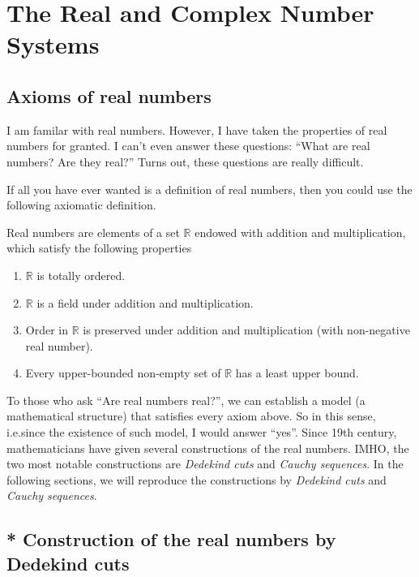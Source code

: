 \chapter{The Real and Complex Number Systems}

\section{Axioms of real numbers}

\par I am familar with real numbers. However, I have taken the properties of real numbers for granted. I can't even answer these questions: ``What are real numbers? Are they real?\@'' Turns out, these questions are really difficult.

\par If all you have ever wanted is a definition of real numbers, then you could use the following axiomatic definition.

\par Real numbers are elements of a set $\mathbb{R}$ endowed with addition and multiplication, which satisfy the following properties
\begin{enumerate}[label = (\roman*)]
    \item $\mathbb{R}$ is totally ordered.
    \item $\mathbb{R}$ is a field under addition and multiplication.
    \item Order in $\mathbb{R}$ is preserved under addition and multiplication (with non-negative real number).
    \item Every upper-bounded non-empty set of $\mathbb{R}$ has a least upper bound.
\end{enumerate}

\par To those who ask ``Are real numbers real?\@'', we can establish a model (a mathematical structure) that satisfies every axiom above. So in this sense, i.e.\@ since the existence of such model, I would answer ``yes''. Since 19th century, mathematicians have given several constructions of the real numbers. IMHO, the two most notable constructions are \textit{Dedekind cuts} and \textit{Cauchy sequences}. In the following sections, we will reproduce the constructions by \textit{Dedekind cuts} and \textit{Cauchy sequences}.

\section{* Construction of the real numbers by Dedekind cuts}

